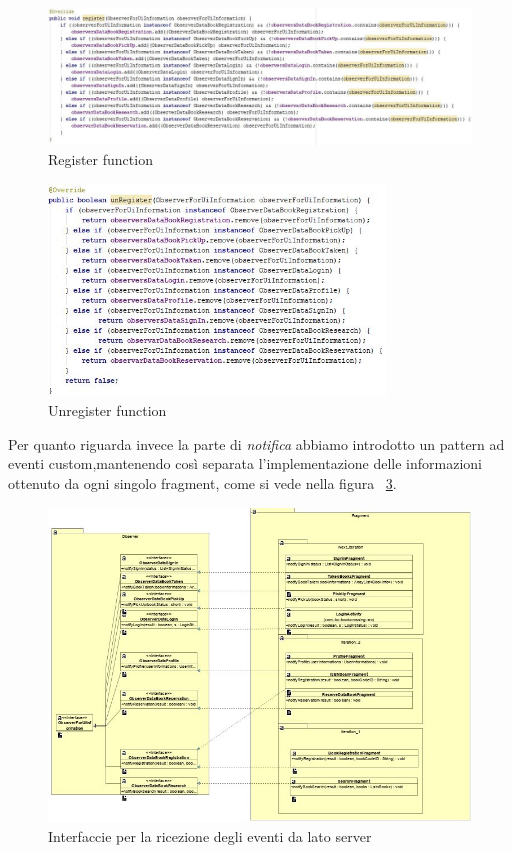 \begin{figure}[h]
	\centering
	\includegraphics[width=\textwidth]{Immagini/Observer/RegisterToDispatcherData.JPG}
	\caption{Register function}
	\label{fig:RegisterFunction}
\end{figure}

\begin{figure}[h]
	\centering
	\includegraphics[width=0.8\textwidth]{Immagini/Observer/UnregisterFromDispatcherData.JPG}
	\caption{Unregister function}
	\label{fig:UnregisterFunction}
\end{figure}

Per quanto riguarda invece la parte di \textit{notifica} abbiamo introdotto un pattern ad eventi custom,mantenendo così separata l'implementazione delle informazioni ottenuto da ogni singolo fragment, come si vede nella figura ~\ref{fig:ObserverForUiInformation}.

\begin{figure}[h]
	\centering
	\includegraphics[width=\textwidth]{Immagini/ObserverForUIInformation}
	\caption{Interfaccie per la ricezione degli eventi da lato server}
	\label{fig:ObserverForUiInformation}
\end{figure}

